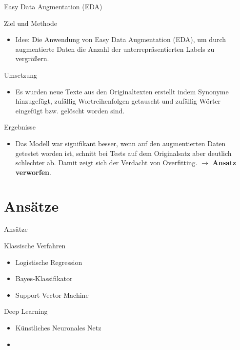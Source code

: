 \documentclass[aspectratio=169]{beamer} %
\begin{document}
\begin{frame}{Easy Data Augmentation (EDA)}
    \begin{block}{Ziel und Methode}
        \begin{itemize} 
            \item Idee: Die Anwendung von Easy Data Augmentation (EDA), um durch augmentierte Daten die Anzahl der unterrepräsentierten Labels zu vergrößern.
        \end{itemize}
    \end{block}

    \begin{block}{Umsetzung}
        \begin{itemize}
            \item Es wurden neue Texte aus den Originaltexten erstellt indem Synonyme hinzugefügt, zufällig Wortreihenfolgen getauscht und zufällig Wörter eingefügt bzw. gelöscht worden sind. 
        \end{itemize}
    \end{block}

    \begin{block}{Ergebnisse}
        \begin{itemize}
            \item Das Modell war signifikant besser, wenn auf den augmentierten Daten getestet worden ist, schnitt bei Tests auf dem Originalsatz aber deutlich schlechter ab. Damit zeigt sich der Verdacht von Overfitting. $\to$ \textbf{Ansatz verworfen}.
        \end{itemize}
    \end{block}
\end{frame}

\section{Ansätze}

\begin{frame}{Ansätze}
    \begin{block}{Klassische Verfahren}
        \begin{itemize}
            \item Logistische Regression
            \item Bayes-Klassifikator
            \item Support Vector Machine
        \end{itemize}
    \end{block}
    \begin{block}{Deep Learning}
        \begin{itemize}
            \item Künstliches Neuronales Netz
            \item {}
        \end{itemize}
    \end{block}
\end{frame}
\end{document}
